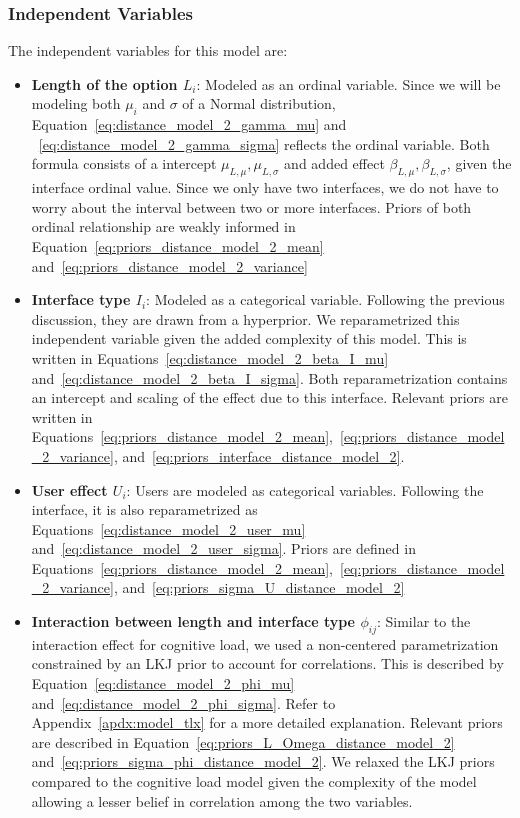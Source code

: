 \subsubsection{Independent Variables}
The independent variables for this model are:
\begin{itemize}
    \item \textbf{Length of the option $L_i$}: Modeled as an ordinal variable. Since we will be modeling both $\mu_i$ and $\sigma$ of a Normal distribution, Equation~\ref{eq:distance_model_2_gamma_mu} and ~\ref{eq:distance_model_2_gamma_sigma} reflects the ordinal variable. Both formula consists of a intercept $\mu_{L,\mu}, \mu_{L,\sigma}$ and added effect $\beta_{L,\mu}, \beta_{L,\sigma}$, given the interface ordinal value. Since we only have two interfaces, we do not have to worry about the interval between two or more interfaces. Priors of both ordinal relationship are weakly informed in Equation~\ref{eq:priors_distance_model_2_mean} and~\ref{eq:priors_distance_model_2_variance}
    \item \textbf{Interface type $I_i$}: Modeled as a categorical variable. Following the previous discussion, they are drawn from a hyperprior. We reparametrized this independent variable given the added complexity of this model. This is written in Equations~\ref{eq:distance_model_2_beta_I_mu} and~\ref{eq:distance_model_2_beta_I_sigma}. Both reparametrization contains an intercept and scaling of the effect due to this interface. Relevant priors are written in Equations~\ref{eq:priors_distance_model_2_mean},~\ref{eq:priors_distance_model_2_variance}, and~\ref{eq:priors_interface_distance_model_2}.
    \item \textbf{User effect $U_i$}: Users are modeled as categorical variables. Following the interface, it is also reparametrized as Equations~\ref{eq:distance_model_2_user_mu} and~\ref{eq:distance_model_2_user_sigma}. Priors are defined in Equations~\ref{eq:priors_distance_model_2_mean},~\ref{eq:priors_distance_model_2_variance}, and~\ref{eq:priors_sigma_U_distance_model_2}
    \item \textbf{Interaction between length and interface type $\phi_{ij}$}: Similar to the interaction effect for cognitive load, we used a non-centered parametrization constrained by an LKJ prior to account for correlations. This is described by Equation~\ref{eq:distance_model_2_phi_mu} and~\ref{eq:distance_model_2_phi_sigma}. Refer to Appendix~\ref{apdx:model_tlx} for a more detailed explanation. Relevant priors are described in Equation~\ref{eq:priors_L_Omega_distance_model_2} and~\ref{eq:priors_sigma_phi_distance_model_2}. We relaxed the LKJ priors compared to the cognitive load model given the complexity of the model allowing a lesser belief in correlation among the two variables.
\end{itemize}

